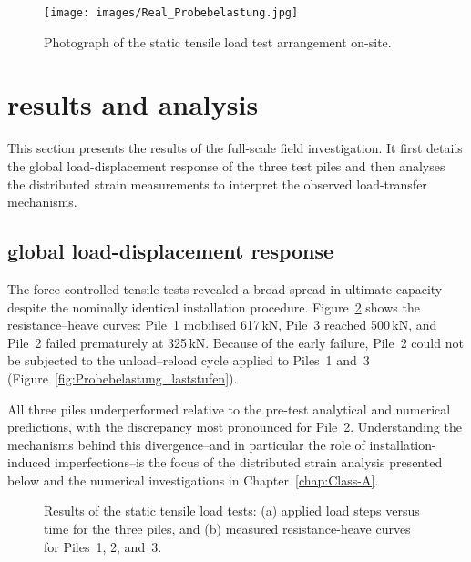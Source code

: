 {{{{\begin{figure}[!htb]
	\begin{center}
		{\texttt{[image: images/Real\_Probebelastung.jpg]}}
		\caption{Photograph of the static tensile load test arrangement on-site.}
		\label{fig:Real_Probebelastung}
	\end{center}
\end{figure}





\section{results and analysis}
\label{sec:results}

This section presents the results of the full-scale field investigation. It first details the global load-displacement response of the three test piles and then analyses the distributed strain measurements to interpret the observed load-transfer mechanisms.

\subsection{global load-displacement response}
\label{subsec:global_load_displacement}

The force-controlled tensile tests revealed a broad spread in ultimate capacity despite the nominally identical installation procedure.
Figure~\ref{fig:Probebelastung_2025} shows the resistance--heave curves: Pile~1 mobilised 617\,kN, Pile~3 reached 500\,kN, and Pile~2 failed prematurely at 325\,kN.
Because of the early failure, Pile~2 could not be subjected to the unload--reload cycle applied to Piles~1 and~3 (Figure~\ref{fig:Probebelastung_laststufen}).

All three piles underperformed relative to the pre-test analytical and numerical predictions, with the discrepancy most pronounced for Pile~2.
Understanding the mechanisms behind this divergence--and in particular the role of installation-induced imperfections--is the focus of the distributed strain analysis presented below and the numerical investigations in Chapter~\ref{chap:Class-A}.

\begin{figure}[!h]
	\centering
	\hspace{0.5cm}
	\caption{Results of the static tensile load tests: (a) applied load steps versus time for the three piles, and (b) measured resistance-heave curves for Piles~1, 2, and~3.}
	\label{fig:Probebelastung_2025}
\end{figure}



}}}}
